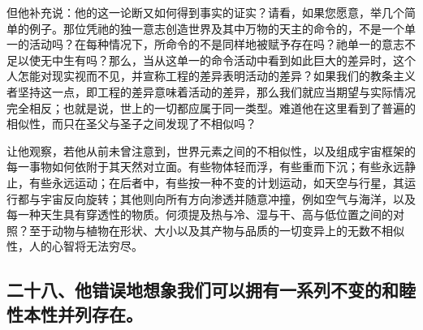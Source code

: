 但他补充说：他的这一论断又如何得到事实的证实？请看，如果您愿意，举几个简单的例子。那位凭祂的独一意志创造世界及其中万物的天主的命令的，不是一个单一的活动吗？在每种情况下，所命令的不是同样地被赋予存在吗？祂单一的意志不足以使无中生有吗？那么，当从这单一的命令活动中看到如此巨大的差异时，这个人怎能对现实视而不见，并宣称工程的差异表明活动的差异？如果我们的教条主义者坚持这一点，即工程的差异意味着活动的差异，那么我们就应当期望与实际情况完全相反；也就是说，世上的一切都应属于同一类型。难道他在这里看到了普遍的相似性，而只在圣父与圣子之间发现了不相似吗？\par

让他观察，若他从前未曾注意到，世界元素之间的不相似性，以及组成宇宙框架的每一事物如何依附于其天然对立面。有些物体轻而浮，有些重而下沉；有些永远静止，有些永远运动；在后者中，有些按一种不变的计划运动，如天空与行星，其运行都与宇宙反向旋转；其他则向所有方向渗透并随意冲撞，例如空气与海洋，以及每一种天生具有穿透性的物质。何须提及热与冷、湿与干、高与低位置之间的对照？至于动物与植物在形状、大小以及其产物与品质的一切变异上的无数不相似性，人的心智将无法穷尽。\par


\subsection{二十八、他错误地想象我们可以拥有一系列不变的和睦性本性并列存在。}

